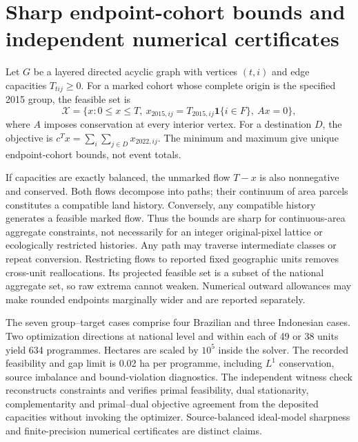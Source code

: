 \section{Sharp endpoint-cohort bounds and independent numerical certificates}
Let $G$ be a layered directed acyclic graph with vertices $(t,i)$ and edge capacities $T_{tij}\ge0$. For a marked cohort whose complete origin is the specified 2015 group, the feasible set is
\[
\mathcal X=\{x:0\le x\le T,\ x_{2015,ij}=T_{2015,ij}\mathbf1\{i\in F\},\ Ax=0\},
\]
where $A$ imposes conservation at every interior vertex. For a destination $D$, the objective is $c^Tx=\sum_i\sum_{j\in D}x_{2022,ij}$. The minimum and maximum give unique endpoint-cohort bounds, not event totals.

If capacities are exactly balanced, the unmarked flow $T-x$ is also nonnegative and conserved. Both flows decompose into paths; their continuum of area parcels constitutes a compatible land history. Conversely, any compatible history generates a feasible marked flow. Thus the bounds are sharp for continuous-area aggregate constraints, not necessarily for an integer original-pixel lattice or ecologically restricted histories. Any path may traverse intermediate classes or repeat conversion. Restricting flows to reported fixed geographic units removes cross-unit reallocations. Its projected feasible set is a subset of the national aggregate set, so raw extrema cannot weaken. Numerical outward allowances may make rounded endpoints marginally wider and are reported separately.

The seven group--target cases comprise four Brazilian and three Indonesian cases. Two optimization directions at national level and within each of 49 or 38 units yield 634 programmes. Hectares are scaled by $10^5$ inside the solver. The recorded feasibility and gap limit is 0.02 ha per programme, including $L^1$ conservation, source imbalance and bound-violation diagnostics. The independent witness check reconstructs constraints and verifies primal feasibility, dual stationarity, complementarity and primal--dual objective agreement from the deposited capacities without invoking the optimizer. Source-balanced ideal-model sharpness and finite-precision numerical certificates are distinct claims.

